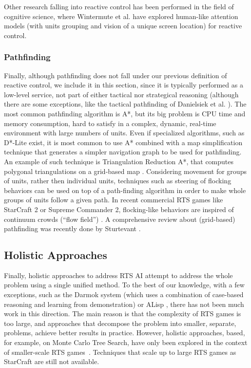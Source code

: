 \documentclass{llncs}
\begin{document}
Other research falling into reactive control has been performed in the
field of cognitive science, where  Wintermute et al. \cite{SORTS} have
explored human-like  attention models (with units  grouping and vision
of a unique screen location) for reactive control.

\subsubsection{Pathfinding}
Finally,  although  pathfinding  does  not  fall  under  our  previous
definition of reactive  control, we include it in  this section, since
it is typically  performed as a low-level service, not  part of either
tactical   nor  strategical   reasoning  (although   there  are   some
exceptions,   like  the   tactical   pathfinding   of  Danielsiek   et
al. \cite{Danielsiek_2008}). The most  common pathfinding algorithm is
A*, but  its big problem is  CPU time and memory  consumption, hard to
satisfy  in  a  complex,  dynamic, real-time  environment  with  large
numbers  of units.  Even if  specialized algorithms,  such as  D*-Lite
\cite{KoenigL02} exist,  it is most common  to use A* combined  with a
map simplification technique that generates a simpler navigation graph
to  be  used  for  pathfinding.   An  example  of  such  technique  is
Triangulation Reduction A*, that  computes polygonal triangulations on
a grid-based  map \cite{Demyen_2006}. Considering movement  for groups
of units, rather then individual units, techniques such as steering of
flocking  behaviors  \cite{Reynolds_1999} can  be  used  on top  of  a
path-finding algorithm in order to make whole groups of units follow a
given path. In recent commercial RTS games like StarCraft 2 or Supreme
Commander 2, flocking-like behaviors  are inspired of continuum crowds
(``flow  field'') \cite{Treuille2006}.  A  comprehensive review  about
(grid-based)   pathfinding    was   recently   done    by   Sturtevant
\cite{sturtevant2012benchmarks}.

\subsection{Holistic Approaches}

Finally, holistic approaches  to address  RTS AI attempt  to address  the whole
problem using a  single unified method. To the best  of our knowledge,
with a few  exceptions, such as the  Darmok system \cite{OntanonMSR10}
(which uses  a combination of  case-based reasoning and  learning from
demonstration) or ALisp \cite{Marthi05}, there  has not been much work
in this  direction.  The  main reason  is that  the complexity  of RTS
games is  too large,  and approaches that  decompose the  problem into
smaller,    separate,   problems,    achieve    better   results    in
practice. However,  holistic approaches, based, for  example, on Monte
Carlo  Tree  Search,  have  only  been  explored  in  the  context  of
smaller-scale RTS games~\cite{ontanon2013naive}. Techniques that scale
up to large RTS games as StarCraft are still not available.
\end{document}
